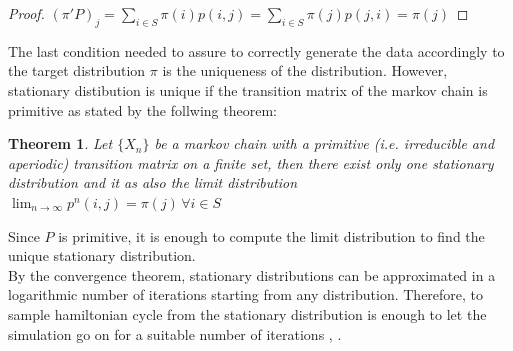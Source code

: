 \documentclass{article}
\newtheorem{theorem}{Theorem}
\begin{document}
\begin{proof}
$ (\pi'P)_j = \sum_{i \in S} \pi(i)p(i,j) = \sum_{i \in S} \pi(j)p(j,i) = \pi(j) $ 
\end{proof}
\noindent The last condition needed to assure to correctly generate the data accordingly to the target distribution $\pi$ is the uniqueness of the distribution. However, stationary distibution is unique if the transition matrix of the markov chain is primitive as stated by the follwing theorem:
\begin{theorem}
Let $\{X_n\}$ be a markov chain with a primitive (i.e. irreducible and aperiodic) transition matrix on a finite set, then  there exist only one stationary distribution and it as also the limit distribution $\lim_{n \to \infty} p^n(i,j) = \pi(j)\,  \forall i \in S$
\end{theorem}
\noindent Since $P$ is primitive, it is enough to compute the limit distribution to find the unique stationary distribution. \\
By the convergence theorem, stationary distributions can be approximated in a logarithmic number of iterations starting from any distribution. Therefore, to sample hamiltonian cycle from the stationary distribution is enough to let the simulation go on for a suitable number of iterations \cite{mctheory}, \cite{mcalgorithm}. \\
\end{document}
